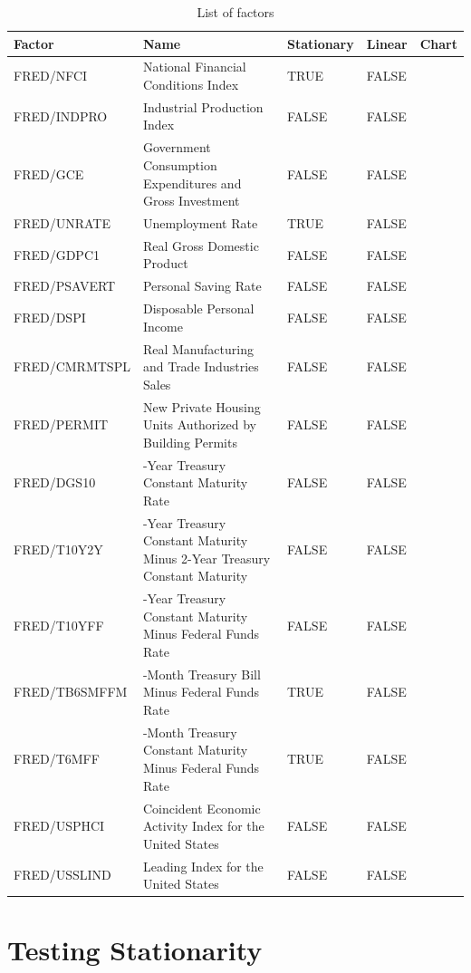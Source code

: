 \documentclass[]{book}
\begin{document}
\begin{table}

\caption{\label{tab:unnamed-chunk-9}List of factors}
\centering
\begin{tabular}[t]{l|>{\raggedright\arraybackslash}p{5cm}|l|l|l}
\hline
Factor & Name & Stationary & Linear & Chart\\
\hline
FRED/NFCI & National Financial Conditions Index & TRUE & FALSE & \\
\hline
FRED/INDPRO & Industrial Production Index & FALSE & FALSE & \\
\hline
FRED/GCE & Government Consumption Expenditures and Gross Investment & FALSE & FALSE & \\
\hline
FRED/UNRATE & Unemployment Rate & TRUE & FALSE & \\
\hline
FRED/GDPC1 & Real Gross Domestic Product & FALSE & FALSE & \\
\hline
FRED/PSAVERT & Personal Saving Rate & FALSE & FALSE & \\
\hline
FRED/DSPI & Disposable Personal Income & FALSE & FALSE & \\
\hline
FRED/CMRMTSPL & Real Manufacturing and Trade Industries Sales & FALSE & FALSE & \\
\hline
FRED/PERMIT & New Private Housing Units Authorized by Building Permits & FALSE & FALSE & \\
\hline
FRED/DGS10 & 10-Year Treasury Constant Maturity Rate & FALSE & FALSE & \\
\hline
FRED/T10Y2Y & 10-Year Treasury Constant Maturity Minus 2-Year Treasury Constant Maturity & FALSE & FALSE & \\
\hline
FRED/T10YFF & 10-Year Treasury Constant Maturity Minus Federal Funds Rate & FALSE & FALSE & \\
\hline
FRED/TB6SMFFM & 6-Month Treasury Bill Minus Federal Funds Rate & TRUE & FALSE & \\
\hline
FRED/T6MFF & 6-Month Treasury Constant Maturity Minus Federal Funds Rate & TRUE & FALSE & \\
\hline
FRED/USPHCI & Coincident Economic Activity Index for the United States & FALSE & FALSE & \\
\hline
FRED/USSLIND & Leading Index for the United States & FALSE & FALSE & \\
\hline
\end{tabular}
\end{table}

\hypertarget{testing-stationarity}{%
\section{Testing Stationarity}\label{testing-stationarity}}
\end{document}
